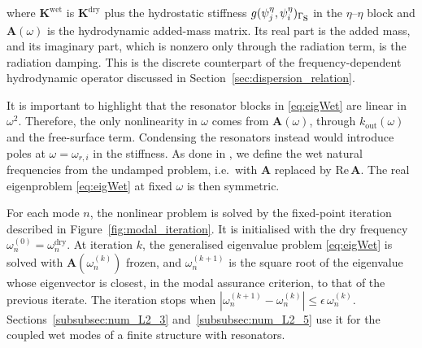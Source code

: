where $\mathbf{K}^{\mathrm{wet}}$ is $\mathbf{K}^{\mathrm{dry}}$ plus the hydrostatic stiffness $g(\psi^\eta_j,\psi^\eta_i)_{\Gamma_{\mbox{s}}}$ in the $\eta$--$\eta$ block and $\mathbf{A}(\omega)$ is the hydrodynamic added-mass matrix. Its real part is the added mass, and its imaginary part, which is nonzero only through the radiation term, is the radiation damping. This is the discrete counterpart of the frequency-dependent hydrodynamic operator discussed in Section~\ref{sec:dispersion_relation}.

It is important to highlight that the resonator blocks in \eqref{eq:eigWet} are linear in $\omega^2$. Therefore, the only nonlinearity in $\omega$ comes from $\mathbf{A}(\omega)$, through $k_{\mathrm{out}}(\omega)$ and the free-surface term. Condensing the resonators instead would introduce poles at $\omega=\omega_{r,i}$ in the stiffness. As done in \cite{agarwal2024dynamic}, we define the wet natural frequencies from the undamped problem, i.e.\ with $\mathbf{A}$ replaced by $\mathrm{Re}\,\mathbf{A}$. The real eigenproblem \eqref{eq:eigWet} at fixed $\omega$ is then symmetric.

For each mode $n$, the nonlinear problem is solved by the fixed-point iteration described in Figure~\ref{fig:modal_iteration}. It is initialised with the dry frequency $\omega_n^{(0)}=\omega_n^{\mathrm{dry}}$. At iteration $k$, the generalised eigenvalue problem \eqref{eq:eigWet} is solved with $\mathbf{A}(\omega_n^{(k)})$ frozen, and $\omega_n^{(k+1)}$ is the square root of the eigenvalue whose eigenvector is closest, in the modal assurance criterion, to that of the previous iterate. The iteration stops when $|\omega_n^{(k+1)}-\omega_n^{(k)}|\leq\epsilon\,\omega_n^{(k)}$. Sections~\ref{subsubsec:num_L2_3} and~\ref{subsubsec:num_L2_5} use it for the coupled wet modes of a finite structure with resonators.



